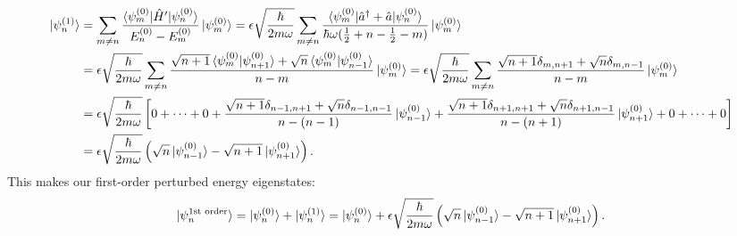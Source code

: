 \documentclass[10pt]{article}
\newcommand{\1}{\mathbf 1}
\begin{document}
\begin{align}
	\ket{\psi_n^{(1)}}
	&=\nonumber
	\sum_{m \ne n}
	\frac{\braket{\psi_m^{(0)} | \hat H' | \psi_n^{(0)}}}{E_n^{(0)} - E_m^{(0)}}
	\ket{\psi_m^{(0)}}
	=
	\epsilon\sqrt{\frac{\hbar}{2m\omega}}
	\sum_{m \ne n}
	\frac{\braket{\psi_m^{(0)} | \hat a^\dagger + \hat a | \psi_n^{(0)}}}{
		\hbar \omega(\frac{1}{2} + n - \frac{1}{2} - m)
	}
	\ket{\psi_m^{(0)}}
	\\
	&=\nonumber
	\epsilon\sqrt{\frac{\hbar}{2m\omega}}
	\sum_{m \ne n}
	\frac{
		\sqrt{n+1}\braket{\psi_m^{(0)} | \psi_{n+1}^{(0)}}
		+
		\sqrt{n}\braket{\psi_m^{(0)} | \psi_{n-1}^{(0)}}
		}{
		n-m
	}
	\ket{\psi_m^{(0)}}
	=
	\epsilon\sqrt{\frac{\hbar}{2m\omega}}
	\sum_{m \ne n}
	\frac{
		\sqrt{n+1}\delta_{m,n+1}
		+
		\sqrt{n}
		\delta_{m,n-1}
		}{
		n-m
	}
	\ket{\psi_m^{(0)}}
	\\
	&=
	\epsilon\sqrt{\frac{\hbar}{2m\omega}}
	\left[
	0
	+
	\cdots
	+
	0
	+
	\frac{
		\sqrt{n+1}\delta_{n-1,n+1}
		+
		\sqrt{n}
		\delta_{n-1,n-1}
		}{
		n-(n-1)
	}
	\ket{\psi_{n-1}^{(0)}}
	+
	\frac{
		\sqrt{n+1}\delta_{n+1,n+1}
		+
		\sqrt{n}
		\delta_{n+1,n-1}
		}{
		n-(n+1)
	}
	\ket{\psi_{n+1}^{(0)}}
	+
	0
	+
	\cdots
	+
	0
	\right]
	\nonumber
	\\
	&=
	\epsilon\sqrt{\frac{\hbar}{2m\omega}}
	\left(
		\sqrt{n} \ket{\psi_{n-1}^{(0)}}
		-
		\sqrt{n+1} \ket{\psi_{n+1}^{(0)}}
	\right).
\end{align}
This makes our first-order perturbed energy eigenstates:
\begin{align}
	\ket{\psi_n^{\text{1st order}}}
	=
	\ket{\psi_n^{(0)}}
	+
	\ket{\psi_n^{(1)}}
	=
	\ket{\psi_n^{(0)}}
	+
	\epsilon\sqrt{\frac{\hbar}{2m\omega}}
	\left(
		\sqrt{n} \ket{\psi_{n-1}^{(0)}}
		-
		\sqrt{n+1} \ket{\psi_{n+1}^{(0)}}
	\right).
\end{align}
\end{document}
